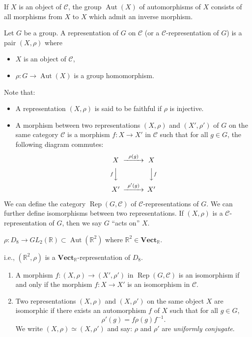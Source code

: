 \documentclass[11pt, a4paper]{report}
\begin{document}
If $X$ is an object of $\mathcal{C}$, the group $\operatorname{Aut}(X)$ of automorphisms of $X$ consists of all morphisms from $X$ to $X$ which admit an inverse morphism.

\begin{definition}
Let $G$ be a group. A representation of $G$ on $\mathcal{C}$ (or a $\mathcal{C}$-representation of $G$) is a pair $(X, \rho)$ where
\begin{itemize}
\item $X$ is an object of $\mathcal{C}$,
\item $\rho: G \rightarrow \operatorname{Aut}(X)$ is a group homomorphism.
\end{itemize}

Note that:
\begin{itemize}
\item A representation $(X, \rho)$ is said to be faithful if $\rho$ is injective.
\item A morphism between two representations $(X, \rho)$ and $(X', \rho')$ of $G$ on the same category $\mathcal{C}$ is a morphism $f: X \rightarrow X'$ in $\mathcal{C}$ such that for all $g \in G$, the following diagram commutes:
\[
\begin{CD}
X @>{\rho(g)}>> X \\
@V{f}VV @VV{f}V \\
X' @>{\rho'(g)}>> X'
\end{CD}
\]
\end{itemize}

We can define the category $\operatorname{Rep}(G, \mathcal{C})$ of $\mathcal{C}$-representations of $G$. We can further define isomorphisms between two representations. If $(X, \rho)$ is a $\mathcal{C}$-representation of $G$, then we say $G$ ``acts on'' $X$.
\end{definition}

\begin{example}
$\rho: D_8 \rightarrow GL_2(\mathbb{R}) \subset \operatorname{Aut}(\mathbb{R}^2)$ where $\mathbb{R}^2 \in \mathbf{Vect}_{\mathbb{R}}$.

i.e., $(\mathbb{R}^2, \rho)$ is a $\mathbf{Vect}_{\mathbb{R}}$-representation of $D_8$.
\end{example}

\begin{lemma}
\begin{enumerate}
\item A morphism $f: (X, \rho) \rightarrow (X', \rho')$ in $\operatorname{Rep}(G, \mathcal{C})$ is an isomorphism if and only if the morphism $f: X \rightarrow X'$ is an isomorphism in $\mathcal{C}$.
\item Two representations $(X, \rho)$ and $(X, \rho')$ on the same object $X$ are isomorphic if there exists an automorphism $f$ of $X$ such that for all $g \in G$,
\[
\rho'(g) = f \rho(g) f^{-1}.
\]
We write $(X, \rho) \simeq (X, \rho')$ and say: $\rho$ and $\rho'$ are \emph{uniformly conjugate}.
\end{enumerate}
\end{lemma}
\end{document}
